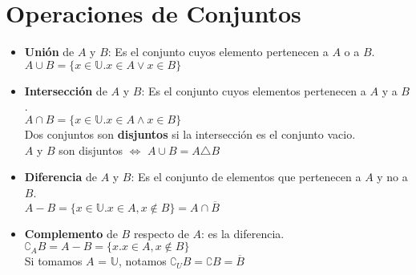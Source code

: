 \documentclass[11pt,a4paper]{article}
\begin{document}
\section{Operaciones de Conjuntos}
\begin{itemize}
\item \textbf{Uni\'on} de $A$ y $B$: Es el conjunto cuyos elemento pertenecen a $A$ o a $B$.\\
$A \cup B = \{x\in \mathbb{U} . x\in A \lor x\in B\}$

\noindent \dotfill
\item \textbf{Intersecci\'on} de $A$ y $B$: Es el conjunto cuyos elementos pertenecen a $A$ y a $B$.\\
$A \cap B = \{x\in \mathbb{U} . x\in A \land x\in B\}$\\
Dos conjuntos son \textbf{disjuntos} si la intersecci\'on es el conjunto vacio.\\
$A$ y $B$ son disjuntos $\iff$ $A \cup B = A \triangle B$

\noindent \dotfill
\item \textbf{Diferencia} de $A$ y $B$: Es el conjunto de elementos que pertenecen a $A$ y no a $B$.\\
$A - B = \{x\in \mathbb{U}.x\in A, x\not \in B\} = A \cap \overline{B}$
\begin{itemize}
\end{itemize}

\noindent \dotfill
\item \textbf{Complemento} de $B$ respecto de $A$: es la diferencia.\\
$\complement_A B = A-B = \{x.x\in A, x\not \in B\}$\\
Si tomamos $A$ = $\mathbb{U}$, notamos $\complement_U B = \complement B = \overline{B}$
\begin{itemize}
\end{itemize}


\end{itemize}
\end{document}
